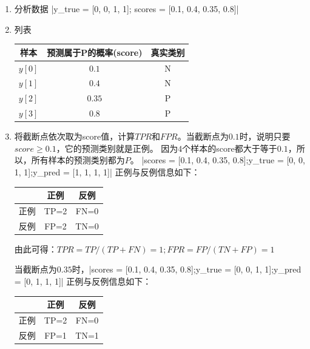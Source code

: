 \begin{enumerate}\itemsep0em
		\item 分析数据 \li|y_true = [0, 0, 1, 1]; scores = [0.1, 0.4, 0.35, 0.8]|
		\item 列表

			\begin{table}[h]
				\centering
				\begin{tabular}{|c|c|c|}\hline
					样本 & 预测属于P的概率(score) & 真实类别 \\\hline
					$y[0]$ & $0.1 $                  & N       \\\hline
					$y[1]$ & $0.4 $                  & N       \\\hline
					$y[2]$ & $0.35$                  & P       \\\hline
					$y[3]$ & $0.8 $                  & P       \\\hline
				\end{tabular}
			\end{table}

		\item 将截断点依次取为score值，计算$TPR$和$FPR$。当截断点为$0.1$时，说明只要$score\ge 0.1$，它的预测类别就是正例。 因为$4$个样本的score都大于等于$0.1$，所以，所有样本的预测类别都为$P$。 \li|scores = [0.1, 0.4, 0.35, 0.8];y_true = [0, 0, 1, 1];y_pred = [1, 1, 1, 1]| 正例与反例信息如下：

			\begin{table}[h]
				\centering
				\begin{tabular}{|c|c|c|}\hline
					& 正例 & 反例 \\\hline
					正例  & TP=2 & FN=0\\\hline
					反例  & FP=2 & TN=0\\\hline
				\end{tabular}
			\end{table}

		由此可得：$ TPR = TP/(TP+FN) = 1; FPR = FP/(TN+FP) = 1$


		当截断点为$0.35$时，\li|scores = [0.1, 0.4, 0.35, 0.8];y_true = [0, 0, 1, 1];y_pred = [0, 1, 1, 1]| 正例与反例信息如下：

			\begin{table}[h]
				\centering
				\begin{tabular}{|c|c|c|}\hline
					& 正例 & 反例 \\\hline
					正例  & TP=2 & FN=0\\\hline
					反例  & FP=1 & TN=1\\\hline
				\end{tabular}
			\end{table}


\end{enumerate}
